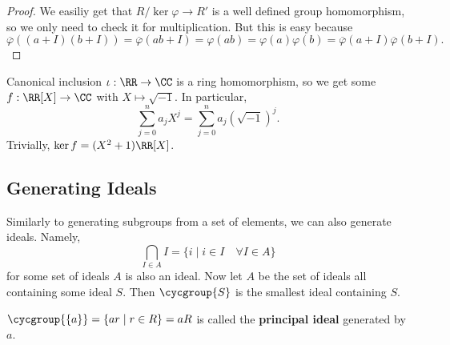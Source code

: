 \begin{proof}
We easiliy get that $R / \ker\varphi \to R'$ is a well defined group
homomorphism, so we only need to check it for multiplication. But this
is easy because
\[ \overline{\varphi}((a + I)(b + I)) = \overline{\varphi}(ab + I) =
\varphi(ab) = \varphi(a)\varphi(b) = \overline{\varphi}(a + I)
\overline{\varphi}(b + I). \]
\end{proof}

\begin{ex}
Canonical inclusion $\iota : \RR \to \CC$ is a ring homomorphism, so we
get some $f : \RR[X] \to \CC$ with $X \mapsto \sqrt{-1}$. In particular,
\[ \sum_{j = 0}^n a_j X^j = \sum_{j = 0}^n a_j (\sqrt{-1})^j. \]
Trivially, $\ker f = (X^2 + 1)\RR[X]$.
\end{ex}

\subsection{Generating Ideals}
Similarly to generating subgroups from a set of elements, we can also
generate ideals. Namely,
\[ \bigcap_{I \in A} I = \lbrace i \mid i \in I \quad \forall I \in A
\rbrace \]
for some set of ideals $A$ is also an ideal. Now let $A$ be the set of
ideals all containing some ideal $S$. Then $\cycgroup{S}$ is the
smallest ideal containing $S$.

\begin{df}
$\cycgroup{\lbrace a \rbrace} = \lbrace ar \mid r \in R \rbrace = aR$ is
called the \textbf{principal ideal} generated by $a$.
\end{df}
